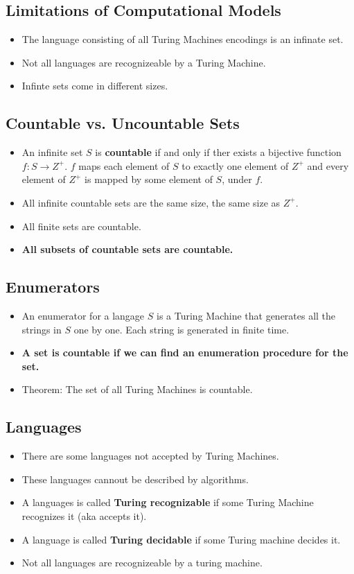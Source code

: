 \documentclass[letter]{article}
\begin{document}
\begin{multicols}{2}
\begin{itemize}
	\section{Limitations of Computational Models}
	\begin{itemize}
		\item The language consisting of all Turing Machines encodings is an
					infinate set.
		\item Not all languages are recognizeable by a Turing Machine.
		\item Infinte sets come in different sizes.
	\end{itemize}
	\subsection{Countable vs. Uncountable Sets}
	\begin{itemize}
		\item An infinite set $S$ is \textbf{countable} if and only if ther exists a
					bijective function $f: S \rightarrow Z^+$. $f$ maps each element of
					$S$ to exactly one element of $Z^+$ and every element of $Z^+$ is
					mapped by some element of $S$, under $f$.
		\item All infinite countable sets are the same size, the same size as $Z^+$.
		\item All finite sets are countable.
		\item \textbf{All subsets of countable sets are countable.}
	\end{itemize}
	\subsection{Enumerators}
	\begin{itemize}
		\item An enumerator for a langage $S$ is a Turing Machine that generates
					all the strings in $S$ one by one. Each string is generated in finite
					time.
		\item \textbf{A set is countable if we can find an enumeration procedure for
					the set.}
		\item Theorem: The set of all Turing Machines is countable.
	\end{itemize}
	\subsection{Languages}
	\begin{itemize}
		\item There are some languages not accepted by Turing Machines.
		\item These languages cannout be described by algorithms.
		\item A languages is called \textbf{Turing recognizable} if some Turing
					Machine recognizes it (aka accepts it).
		\item A language is called \textbf{Turing decidable} if some Turing machine
					decides it.
		\item Not all languages are recognizeable by a turing machine.
	\end{itemize}


\end{itemize}
\end{multicols}
\end{document}
